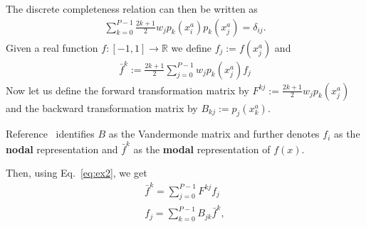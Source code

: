 The discrete completeness relation can then be written as
\begin{align}
    \sum_{k=0}^{P-1} \frac{2k+1}{2}w_j p_k(x^a_i)p_k(x^a_j) = \delta_{ij}.
    \label{eq:completeness}
\end{align}
Given a real function $f:[-1,1]\rightarrow \mathbb{R}$ we define $f_j:=f(x^a_j)$ and
\begin{align} \label{eq:ex2}
    \bar f^k := \frac{2k+1}{2}\sum_{j=0}^{P-1}w_j p_k(x^a_j) f_j
\end{align}
Now let us define the forward transformation matrix by $F^{kj}:=\frac{2k+1}{2}w_jp_k(x^a_j)$ and
the backward transformation matrix by $B_{kj}:= p_j(x^a_k)$.
\begin{tcolorbox}[title=Note]
Reference~\cite{NodalDG} identifies $B$ as the Vandermonde matrix and further denotes $f_i$ as the \textbf{nodal} representation and $\bar f^k$ as the \textbf{modal} representation of $f(x)$.
\end{tcolorbox}

Then, using Eq.~\eqref{eq:ex2}, we get
\begin{subequations}
\begin{align}
    \bar f^k = \sum_{j=0}^{P-1}F^{kj}f_j \\
    f_j = \sum_{k=0}^{P-1} B_{jk}\bar f^k,
\end{align}
\end{subequations}

